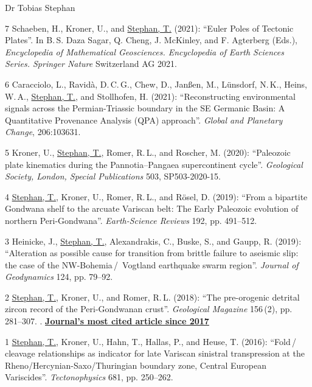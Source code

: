 \documentclass[10pt, paper=letter]{scrartcl} %
\begin{document}
\begin{cv}{\textsf{Dr Tobias Stephan}}
\begin{cvlist}{}
        \item[7] Schaeben, H., Kroner, U., and \ul{Stephan, T.} (2021): \enquote{Euler Poles of Tectonic Plates}. In B.\,S. Daza Sagar, Q. Cheng, J. McKinley, and F. Agterberg (Eds.), \textit{Encyclopedia of Mathematical Geosciences. Encyclopedia of Earth Sciences Series. Springer Nature} Switzerland AG 2021. 
        \item[6] Caracciolo, L., Ravid\`a, D.\,C.\,G., Chew, D., Jan{\ss}en, M., L\"unsdorf, N.\,K., Heins, W.\,A., \ul{Stephan, T.}, and Stollhofen, H. (2021): \enquote{Reconstructing environmental signals across the Permian-Triassic boundary in the SE Germanic Basin: A Quantitative Provenance Analysis (QPA) approach}. \textit{Global and Planetary Change}, 206:103631.  
        \item[5] Kroner, U., \ul{Stephan, T.}, Romer, R.\,L., and Roscher, M. (2020): \enquote{Paleozoic plate kinematics during the Pannotia--Pangaea supercontinent cycle}. \textit{Geological Society, London, Special Publications} 503, SP503-2020-15. 
        \item[4] \ul{Stephan, T.}, Kroner, U., Romer, R.\,L., and R\"osel, D. (2019): \enquote{From a bipartite Gondwana shelf to the arcuate Variscan belt: The Early Paleozoic evolution of northern Peri-Gondwana}. \textit{Earth-Science Reviews} 192, pp. 491--512. 
        \item[3] Heinicke, J., \ul{Stephan, T.}, Alexandrakis, C., Buske, S., and Gaupp, R. (2019): \enquote{Alteration as possible cause for transition from brittle failure to aseismic slip: the case of the NW-Bohemia\,/\, Vogtland earthquake swarm region}. \textit{Journal of Geodynamics} 124, pp. 79--92. 
        \item[2] \ul{Stephan, T.}, Kroner, U., and Romer, R.\,L. (2018): \enquote{The pre-orogenic detrital zircon record of the Peri-Gondwanan crust}. \textit{Geological Magazine} 156\,(2), pp. 281--307.\newline
        .
        \href{https://www.cambridge.org/core/journals/geological-magazine/most-cited?searchWithinIds=277295E1DFDC1E4700796E746AE514CC&productType=JOURNAL_ARTICLE&pageSize=20&filters\%5BisCitedByMin\%5D=0&template=cambridge-core\%2Fjournal\%2Farticle-listings\%2Flistings-wrapper&displayNasaAds=false&showCitationNumbers=true&suppressArticleTypeGrouping=true&sort=platformMetadata.citationCount.crossRef\%3Adesc&filters\%5BdateYearRange\%5D\%5Bfrom\%5D=2017}{\textbf{Journal's most cited article since 2017}}
        \item[1] \ul{Stephan, T.}, Kroner, U., Hahn, T., Hallas, P., and Heuse, T. (2016): \enquote{Fold\,/\,cleavage relationships as indicator for late Variscan sinistral transpression at the Rheno\-/Hercynian\--Saxo\-/Thuringian boundary zone, Central European Variscides}. \textit{Tectonophysics} 681, pp. 250--262. 


\end{cvlist}
\end{cv}
\end{document}
